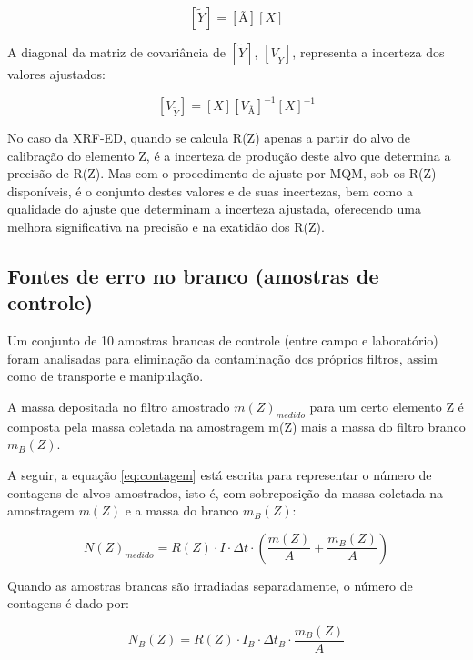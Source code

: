 \begin{equation}
  \label{eq:polinomioajustado}
  [\tilde{Y}] = [Ã][X]
\end{equation}

A diagonal da matriz de covariância de $[\tilde{Y}]$, $[V_{\tilde{Y}}]$, 
representa a incerteza dos valores ajustados:

\begin{equation}
  \label{eq:matrizcovarianciaY}
  [V_{\tilde{Y}}] = [X] [V_{Ã}]^{-1} [X]^{-1}
\end{equation}

No caso da XRF-ED, quando se calcula R(Z) apenas a partir do alvo de 
calibração do elemento Z, é a incerteza de produção deste alvo que determina 
a precisão de R(Z). Mas com o procedimento de ajuste por MQM, sob os 
R(Z) disponíveis, é o conjunto destes valores e de suas incertezas, bem como a 
qualidade do ajuste que determinam a incerteza ajustada, oferecendo uma 
melhora significativa na precisão e na exatidão dos R(Z).

\subsection{Fontes de erro no branco (amostras de controle)}

Um conjunto de 10 amostras brancas de controle (entre campo e laboratório) 
foram analisadas para eliminação da contaminação dos próprios filtros, assim como de 
transporte e manipulação.

A massa depositada no filtro amostrado $m(Z)_{medido}$ para um certo elemento Z
é composta pela massa coletada na amostragem m(Z) mais a massa do filtro 
branco $m_{B}(Z)$.

A seguir, a equação \ref{eq:contagem} está escrita para representar o número de contagens de alvos amostrados, isto é, com sobreposição da massa coletada na amostragem $m(Z)$ e a massa do branco $m_B(Z)$: 

\begin{equation}
  \label{eq:contagem_medida}
  N(Z)_{medido} = R(Z) \cdot I \cdot \Delta t \cdot \left( \frac{m(Z)}{A} + \frac{m_B(Z)}{A} \right)
\end{equation}  

Quando as amostras brancas são irradiadas separadamente, o número de contagens é dado por:

\begin{equation}
  \label{eq:contagembranco}
  N_B(Z) = R(Z) \cdot I_B \cdot \Delta t_B \cdot \frac{m_B(Z)}{A}
\end{equation}

